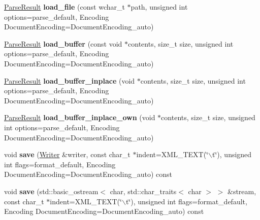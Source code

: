 \begin{DoxyCompactItemize}
\item 
\hypertarget{classphys_1_1xml_1_1Document_a938cc766c99bcc0a23fd3b8d0d079b00}{
\hyperlink{structphys_1_1xml_1_1ParseResult}{ParseResult} {\bfseries load\_\-file} (const wchar\_\-t $\ast$path, unsigned int options=parse\_\-default, Encoding DocumentEncoding=DocumentEncoding\_\-auto)}
\label{dd/d44/classphys_1_1xml_1_1Document_a938cc766c99bcc0a23fd3b8d0d079b00}

\item 
\hypertarget{classphys_1_1xml_1_1Document_a637b39218496c15244470820413a90ab}{
\hyperlink{structphys_1_1xml_1_1ParseResult}{ParseResult} {\bfseries load\_\-buffer} (const void $\ast$contents, size\_\-t size, unsigned int options=parse\_\-default, Encoding DocumentEncoding=DocumentEncoding\_\-auto)}
\label{dd/d44/classphys_1_1xml_1_1Document_a637b39218496c15244470820413a90ab}

\item 
\hypertarget{classphys_1_1xml_1_1Document_ae3b3a8d01758e778127c038d75d7dc48}{
\hyperlink{structphys_1_1xml_1_1ParseResult}{ParseResult} {\bfseries load\_\-buffer\_\-inplace} (void $\ast$contents, size\_\-t size, unsigned int options=parse\_\-default, Encoding DocumentEncoding=DocumentEncoding\_\-auto)}
\label{dd/d44/classphys_1_1xml_1_1Document_ae3b3a8d01758e778127c038d75d7dc48}

\item 
\hypertarget{classphys_1_1xml_1_1Document_a9e1432746fcfad902387ca0812bd6282}{
\hyperlink{structphys_1_1xml_1_1ParseResult}{ParseResult} {\bfseries load\_\-buffer\_\-inplace\_\-own} (void $\ast$contents, size\_\-t size, unsigned int options=parse\_\-default, Encoding DocumentEncoding=DocumentEncoding\_\-auto)}
\label{dd/d44/classphys_1_1xml_1_1Document_a9e1432746fcfad902387ca0812bd6282}

\item 
\hypertarget{classphys_1_1xml_1_1Document_acadaa049fa5f3311fc0ecdd1e01eda14}{
void {\bfseries save} (\hyperlink{classphys_1_1xml_1_1Writer}{Writer} \&writer, const char\_\-t $\ast$indent=XML\_\-TEXT(\char`\"{}$\backslash$t\char`\"{}), unsigned int flags=format\_\-default, Encoding DocumentEncoding=DocumentEncoding\_\-auto) const }
\label{dd/d44/classphys_1_1xml_1_1Document_acadaa049fa5f3311fc0ecdd1e01eda14}

\item 
\hypertarget{classphys_1_1xml_1_1Document_a64519e32f832f20f36f725093ebc155a}{
void {\bfseries save} (std::basic\_\-ostream$<$ char, std::char\_\-traits$<$ char $>$ $>$ \&stream, const char\_\-t $\ast$indent=XML\_\-TEXT(\char`\"{}$\backslash$t\char`\"{}), unsigned int flags=format\_\-default, Encoding DocumentEncoding=DocumentEncoding\_\-auto) const }
\label{dd/d44/classphys_1_1xml_1_1Document_a64519e32f832f20f36f725093ebc155a}


\end{DoxyCompactItemize}
